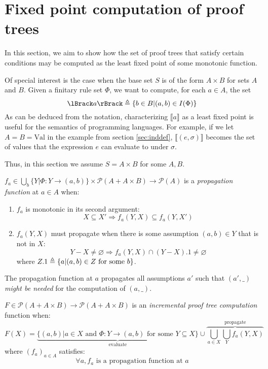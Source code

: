 \documentclass[12pt]{article}
\begin{document}
\section{Fixed point computation of proof trees}
In this section, we aim to show how the set of proof trees that satisfy certain conditions may be computed as the least fixed point of some monotonic function.

Of special interest is the case when the base set $S$ is of the form $A\times B$ for sets $A$ and $B$.
Given a finitary rule set $\Phi$, we want to compute, for each $a\in A$, the set
\[\lBrack a\rBrack\defeq\{b\in B|(a,b)\in I(\Phi)\}\]
As can be deduced from the notation, characterizing $\lBrack a\rBrack$ as a least fixed point is useful for the semantics of programming languages.
For example, if we let $A=B=\text{Val}$ in the example from section \ref{sec:inddef}, $\lBrack (e,\sigma)\rBrack$ becomes the set of values that the expression $e$ can evaluate to under $\sigma$.

Thus, in this section we assume $S=A\times B$ for some $A,B$.
\begin{definition}\label{def:propagation}
	$f_a\in\bigcup_b\{Y|\Phi:Y\rightarrow(a,b)\}\times\mathcal{P}(A+A\times B)\rightarrow\mathcal{P}(A)$ is a \emph{propagation function} at $a\in A$ when:
	\begin{enumerate}
		\item $f_a$ is monotonic in its second argument:
		      \[X\subseteq X'\Rightarrow f_a(Y,X)\subseteq f_a(Y,X')\]
		\item $f_a(Y,X)$ must propagate when there is some assumption $(a,b)\in Y$ that is not in $X$:
		      \[Y-X\neq\varnothing\Rightarrow f_a(Y,X)\cap(Y-X).1\neq\varnothing\]
		      where $Z.1\triangleq\{a|(a,b)\in Z\text{ for some }b\}$.
	\end{enumerate}
\end{definition}

The propagation function at $a$ propagates all assumptions $a'$ such that $(a',\_)$ \emph{might be needed} for the computation of $(a,\_)$.

\begin{definition}
	$F\in\mathcal{P}(A+A\times B)\rightarrow\mathcal{P}(A+A\times B)$ is an \emph{incremental proof tree computation} function when:
\[F(X)=\underbrace{\{(a,b)|a\in X\text{ and }\Phi:Y\rightarrow(a,b)\text{ for some }Y\subseteq X\}}_{\text{evaluate}}\cup\overbrace{\bigcup_{a\in X}\bigcup_{Y}f_a(Y,X)}^{\text{propagate}}\]
	where $(f_a)_{a\in A}$ satisfies:
	\[\forall a,f_a\text{ is a propagation function at }a\]
\end{definition}
\end{document}
